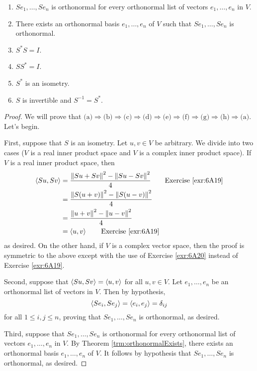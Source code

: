 \documentclass[../main.tex]{subfiles}
\begin{document}
\begin{itemize}
\begin{theorem}
\begin{enumerate}[label={\textup{(}\alph*\textup{)}}]
            \item $Se_1,\dots,Se_n$ is orthonormal for every orthonormal list of vectors $e_1,\dots,e_n$ in $V$.
            \item There exists an orthonormal basis $e_1,\dots,e_n$ of $V$ such that $Se_1,\dots,Se_n$ is orthonormal.
            \item $S^*S=I$.
            \item $SS^*=I$.
            \item $S^*$ is an isometry.
            \item $S$ is invertible and $S^{-1}=S^*$.
        \end{enumerate}
        \begin{proof}
            We will prove that $\text{(a)}\Rightarrow\text{(b)}\Rightarrow\text{(c)}\Rightarrow\text{(d)}\Rightarrow\text{(e)}\Rightarrow\text{(f)}\Rightarrow\text{(g)}\Rightarrow\text{(h)}\Rightarrow\text{(a)}$. Let's begin.\par\smallskip
            First, suppose that $S$ is an isometry. Let $u,v\in V$ be arbitrary. We divide into two cases ($V$ is a real inner product space and $V$ is a complex inner product space). If $V$ is a real inner product space, then
            \begin{align*}
                \inp{Su}{Sv} &= \frac{\norm{Su+Sv}^2-\norm{Su-Sv}^2}{4}\tag*{Exercise \ref{exr:6A19}}\\
                &= \frac{\norm{S(u+v)}^2-\norm{S(u-v)}^2}{4}\\
                &= \frac{\norm{u+v}^2-\norm{u-v}^2}{4}\\
                &= \inp{u}{v}\tag*{Exercise \ref{exr:6A19}}
            \end{align*}
            as desired. On the other hand, if $V$ is a complex vector space, then the proof is symmetric to the above except with the use of Exercise \ref{exr:6A20} instead of Exercise \ref{exr:6A19}.\par
            Second, suppose that $\left\langle{Su},{Sv}\right\rangle=\left\langle{u},{v}\right\rangle$ for all $u,v\in V$. Let $e_1,\dots,e_n$ be an orthonormal list of vectors in $V$. Then by hypothesis,
            \begin{equation*}
                \left\langle{Se_i},{Se_j}\right\rangle = \left\langle{e_i},{e_j}\right\rangle = \delta_{ij}
            \end{equation*}
            for all $1\leq i,j\leq n$, proving that $Se_1,\dots,Se_n$ is orthonormal, as desired.\par
            Third, suppose that $Se_1,\dots,Se_n$ is orthonormal for every orthonormal list of vectors $e_1,\dots,e_n$ in $V$. By Theorem \ref{trm:orthonormalExists}, there exists an orthonormal basis $e_1,\dots,e_n$ of $V$. It follows by hypothesis that $Se_1,\dots,Se_n$ is orthonormal, as desired.\par

\end{proof}
\end{theorem}
\end{itemize}
\end{document}
